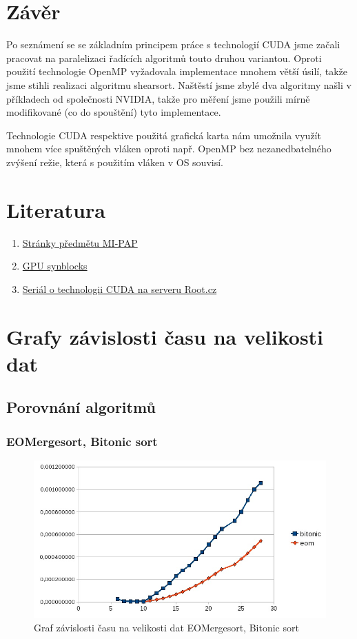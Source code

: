 \documentclass[12pt]{article}
\begin{document}
\section{Závěr}
Po seznámení se se základním principem práce s technologií CUDA jsme začali pracovat na paralelizaci řadících algoritmů touto druhou variantou. Oproti použití technologie OpenMP vyžadovala implementace mnohem větší úsilí, takže jsme stihli realizaci algoritmu shearsort. Naštěstí jsme zbylé dva algoritmy našli v příkladech od společnosti NVIDIA, takže pro měření jsme použili mírně modifikované (co do spouštění) tyto implementace.

Technologie CUDA respektive použitá grafická karta nám umožnila využít mnohem více spuštěných vláken oproti např. OpenMP bez nezanedbatelného zvýšení režie, která s použitím vláken v OS souvisí. 
\section{Literatura}
\begin{enumerate}
\item \href{https://edux.fit.cvut.cz/courses/MI-PAP}{Stránky předmětu MI-PAP}
\item \href{http://aggregate.org/MAGIC/#GPU SyncBlocks}{\label{cud:synblocks}GPU synblocks}
\item \href{http://www.root.cz/serialy/uvod-do-technologie-cuda/}{Seriál o technologii CUDA na serveru Root.cz}
\end{enumerate}

\appendix
\section{Grafy závislosti času na velikosti dat}

\subsection{Porovnání algoritmů}
\subsubsection{EOMergesort, Bitonic sort}
\begin{figure}[H]
\begin{center}
\includegraphics[width=14cm]{cuda-eom-bit.jpg}
\caption{Graf závislosti času na velikosti dat EOMergesort, Bitonic sort}
\label{fig:cuda-eom-bit}
\end{center}
\end{figure}
\end{document}
